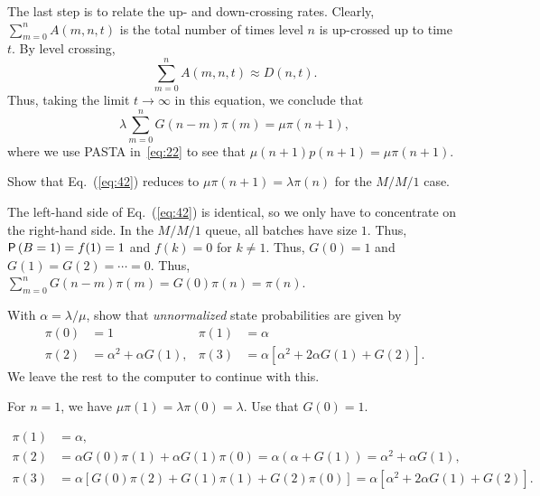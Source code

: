 The last step is to relate the up- and down-crossing rates.  Clearly, $\sum_{m=0}^n A(m,n,t)$ is  the total number of times level $n$ is up-crossed up to time~$t$. By level crossing,
 \begin{equation*}
 \sum_{m=0}^n A(m,n,t) \approx  D(n,t). 
\end{equation*}
Thus, taking the limit $t\to\infty$ in this equation, we conclude that
\begin{equation}\label{eq:42}
\lambda  \sum_{m=0}^n G(n-m) \pi(m) = \mu \pi(n+1),
\end{equation}
where we use  PASTA in~\eqref{eq:22} to see that $\mu(n+1)p(n+1) = \mu \pi(n+1)$. 

\begin{exercise}{\faFlask}
  Show that Eq.~(\ref{eq:42}) reduces to $\mu \pi(n+1)=\lambda \pi(n)$ for the $M/M/1$ case.
  \begin{solution}
    The left-hand side of Eq.~(\ref{eq:42}) is identical, so we only
    have to concentrate on the right-hand side. In the $M/M/1$ queue,
    all batches have size $1$. Thus, $\P{B=1} = f(1)=1$ and $f(k)=0$
    for $k\neq 1$. Thus, $G(0)=1$ and $G(1)=G(2)=\cdots = 0$. Thus,
    $\sum_{m=0}^n G(n-m) \pi(m) = G(0)\pi(n)=\pi(n)$.
  \end{solution}
\end{exercise}

\begin{exercise}{\faCalculator}\label{ex:13}
With $\alpha = \lambda/\mu$,  show that \emph{unnormalized} state probabilities are given by
\begin{align*}
\pi(0) & = 1 &
  \pi(1) &= \alpha \\
  \pi(2) &= \alpha^2 + \alpha G(1), &
  \pi(3) &= \alpha[ \alpha^2 + 2 \alpha G(1) + G(2)].
\end{align*}
We leave the rest to the computer to continue with this.
\begin{hint}
For $n=1$, we have
$\mu \pi(1) = \lambda \pi(0)=\lambda$. Use that $G(0)=1$.
\end{hint}
\begin{solution}
\begin{equation*}
  \begin{split}
  \pi(1) &= \alpha, \\
  \pi(2) &= \alpha G(0) \pi(1) + \alpha G(1) \pi(0) =\alpha(\alpha+ G(1)) = \alpha^2 + \alpha G(1), \\
  \pi(3) 
&= \alpha[G(0) \pi(2) + G(1) \pi(1) + G(2) \pi(0)]  = \alpha[ \alpha^2 + 2 \alpha G(1) + G(2)].
  \end{split}
\end{equation*}
\end{solution}  
\end{exercise}


